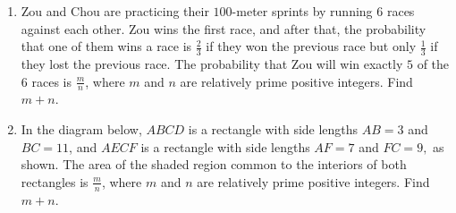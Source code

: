 \documentclass{article}
\begin{document}
\begin{enumerate}[label=\arabic*., itemsep=0.5em]
\item Zou and Chou are practicing their \(100\)-meter sprints by running \(6\) races against each other. Zou wins the first race, and after that, the probability that one of them wins a race is \(\frac23\) if they won the previous race but only \(\frac13\) if they lost the previous race. The probability that Zou will win exactly \(5\) of the \(6\) races is \(\frac mn\), where \(m\) and \(n\) are relatively prime positive integers. Find \(m+n\).\par \vspace{0.5em}\item In the diagram below, \(ABCD\) is a rectangle with side lengths \(AB=3\) and \(BC=11\), and \(AECF\) is a rectangle with side lengths \(AF=7\) and \(FC=9,\) as shown. The area of the shaded region common to the interiors of both rectangles is \(\frac mn\), where \(m\) and \(n\) are relatively prime positive integers. Find \(m+n\).



\end{enumerate}
\end{document}
